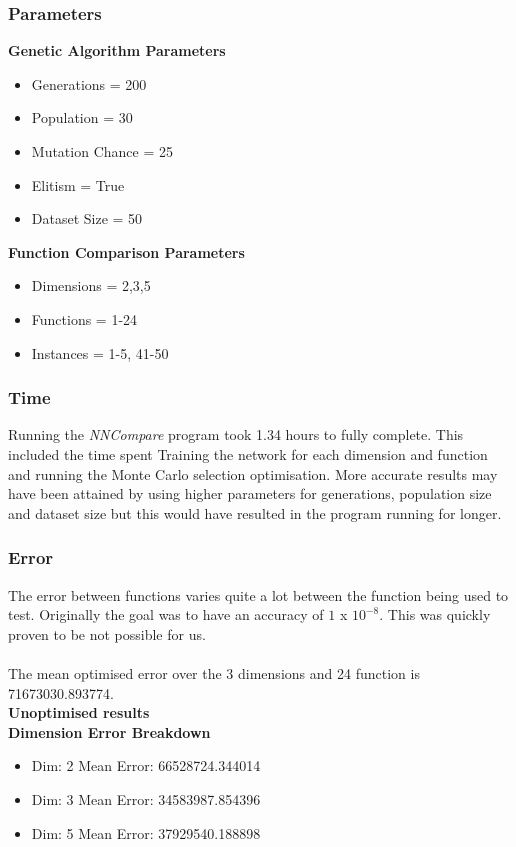 \documentclass[12pt]{article}
\begin{document}
\subsubsection{Parameters}
\textbf{Genetic Algorithm Parameters}
\begin{itemize}
	\item Generations = 200
	\item Population = 30
	\item Mutation Chance = 25%
	\item Elitism = True
	\item Dataset Size = 50
\end{itemize}
\textbf{Function Comparison Parameters}
\begin{itemize}
	\item Dimensions = 2,3,5
	\item Functions = 1-24
	\item Instances = 1-5, 41-50
\end{itemize}

\subsubsection{Time}
Running the \textit{NNCompare} program took 1.34 hours to fully complete. This included the time spent Training the network for each dimension and function and running the Monte Carlo selection optimisation. More accurate results may have been attained by using higher parameters for generations, population size and dataset size but this would have resulted in the program running for longer.

\subsubsection{Error}
The error between functions varies quite a lot between the function being used to test. Originally the goal was to have an accuracy of $1$ x $10^{-8}$. This was quickly proven to be not possible for us. \\\\
The mean optimised error over the 3 dimensions and 24 function is 71673030.893774.\\

\quad\textbf{Unoptimised results}\\

\textbf{Dimension Error Breakdown}
\begin{itemize}
\item Dim: 2  Mean Error: 66528724.344014
\item Dim: 3  Mean Error: 34583987.854396
\item Dim: 5  Mean Error: 37929540.188898
\end{itemize}
\end{document}
